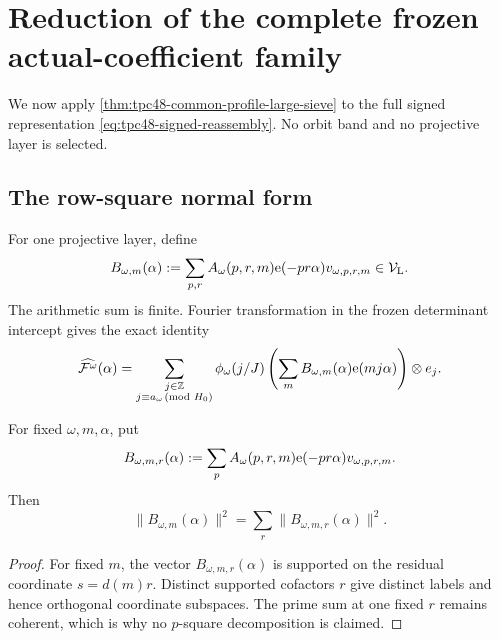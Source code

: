 \section{Reduction of the complete frozen actual-coefficient family}
\label{sec:tpc48-actual-reduction}

We now apply \cref{thm:tpc48-common-profile-large-sieve} to the full
signed representation \eqref{eq:tpc48-signed-reassembly}.  No orbit
band and no projective layer is selected.

\subsection{The row-square normal form}

For one projective layer, define
\begin{equation}
 B_{\omega,m}(\alpha)
 :=\sum_{p,r}A_\omega(p,r,m)\mathrm e(-pr\alpha)
 v_{\omega,p,r,m}\in\mathcal V_{\mathrm L}.
 \label{eq:tpc48-row-vector}
\end{equation}
The arithmetic sum is finite.  Fourier transformation in the frozen
determinant intercept gives the exact identity
\begin{equation}
 \widehat{\mathcal F^\omega}(\alpha)
 =\sum_{\substack{j\in\mathbb Z\\j\equiv a_\omega\!\!\pmod{H_0}}}
 \phi_\omega(j/J)
 \left(\sum_mB_{\omega,m}(\alpha)\mathrm e(mj\alpha)\right)
 \otimes e_j.
 \label{eq:tpc48-layer-shift-transform}
\end{equation}

\begin{proposition}
\label{prop:tpc48-residual-square}
For fixed \(\omega,m,\alpha\), put
\begin{equation}
 B_{\omega,m,r}(\alpha)
 :=\sum_pA_\omega(p,r,m)\mathrm e(-pr\alpha)
 v_{\omega,p,r,m}.
 \label{eq:tpc48-inner-prime-sum}
\end{equation}
Then
\begin{equation}
 \boxed{
 \|B_{\omega,m}(\alpha)\|^2
 =\sum_r\|B_{\omega,m,r}(\alpha)\|^2.}
 \label{eq:tpc48-residual-square}
\end{equation}
\end{proposition}

\begin{proof}
For fixed \(m\), the vector
\(B_{\omega,m,r}(\alpha)\) is supported on the residual coordinate
\(s=d(m)r\).  Distinct supported cofactors \(r\) give distinct labels
and hence orthogonal coordinate subspaces.  The prime sum at one fixed
\(r\) remains coherent, which is why no \(p\)-square decomposition is
claimed.
\end{proof}

